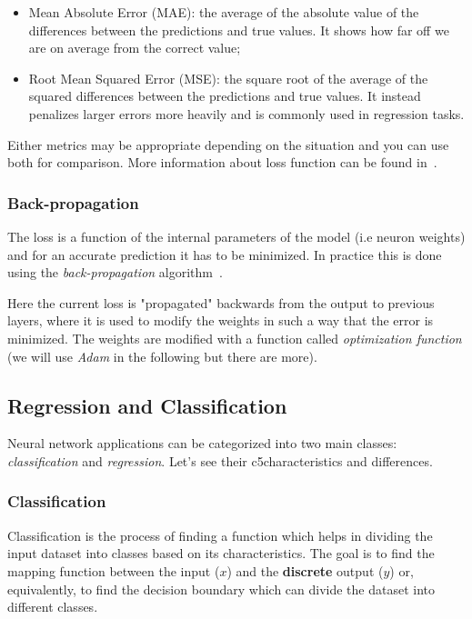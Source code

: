 \begin{itemize}
\tightlist
\item Mean Absolute Error (MAE): the average of the absolute value of the differences between the predictions and true values. It shows how far off we are on average from the correct value;
\item Root Mean Squared Error (MSE): the square root of the average of the squared differences between the predictions and true values. It instead penalizes larger errors more heavily and is commonly used in regression tasks. 
\end{itemize}
Either metrics may be appropriate depending on the situation and you can use both for comparison. More information about loss function can be found in~\cite{bib:loss_function}.

\subsubsection{Back-propagation}
The loss is a function of the internal parameters of the model (i.e neuron weights) and for an accurate prediction it has to be minimized. In practice this is done using the \emph{back-propagation} algorithm~\cite{bib:backpropagation}.

Here the current loss is "propagated" backwards from the output to previous layers, where it is used to modify the weights in such a way that the error is minimized. The weights are modified with a function called \emph{optimization function} (we will use \emph{Adam} in the following but there are more).

\subsection{Regression and Classification}
\label{regression-and-classification}

Neural network applications can be categorized into two main classes: \emph{classification} and \emph{regression}. Let's see their c5characteristics and differences.

\subsubsection{Classification}
\label{classification}

Classification is the process of finding a function which helps in dividing the input dataset into classes based on its characteristics. The goal is to find the mapping function between the input ($x$) and the \textbf{discrete} output ($y$) or, equivalently, to find the decision boundary which can divide the dataset into different classes.

